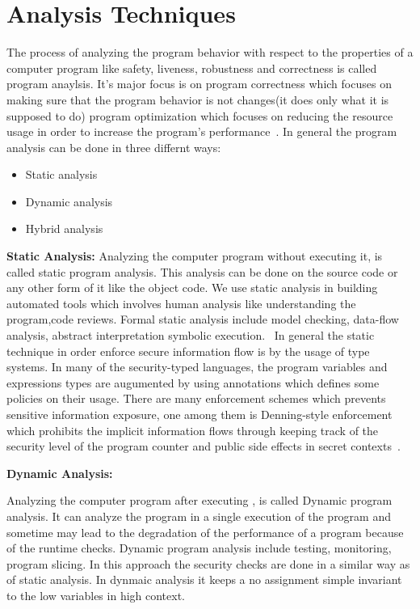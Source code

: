 \section{Analysis Techniques}

The process of analyzing the program behavior with respect to the properties of a computer program like safety, liveness,
robustness and correctness is called program anaylsis. It's major focus is on program correctness which focuses
on making sure that the program behavior is not changes(it does only what it is supposed to do) program optimization which focuses
on reducing the resource usage in order to increase the program's performance~\cite{wiki:analysis}.
In general the program analysis can be done in three differnt ways:

\begin{itemize}
\item Static analysis
\item Dynamic analysis
\item Hybrid analysis
\end{itemize}

\textbf{Static Analysis:}
Analyzing the computer program without executing it, is called static program analysis.
This analysis can be done on the source code or any other form of it like the object code.
We use static analysis in building automated tools which involves human analysis like understanding the program,code reviews.
Formal static analysis include model checking, data-flow analysis, abstract interpretation
symbolic execution.~\cite{survey:automated}
In general the static technique in order enforce secure information
flow is by the usage of type systems. In many of the security-typed languages,
the program variables and expressions types are augumented by using
annotations which defines some policies on their usage. There are many enforcement
schemes which prevents sensitive information exposure, one among them
is Denning-style enforcement which prohibits the implicit information
flows through keeping track of the security level of the program counter and
public side effects in secret contexts~\cite{book:analysis}.

\textbf{Dynamic Analysis:}

Analyzing the computer program after executing , is 
called Dynamic program analysis. It can analyze the program in a single
execution of the program and sometime may lead to the degradation of 
the performance of a program because of the runtime checks. Dynamic
program analysis include testing, monitoring, program slicing.
In this approach the security checks are done in a similar way as of static
analysis. In dynmaic analysis it keeps a no assignment simple invariant to 
the low variables in high context.

